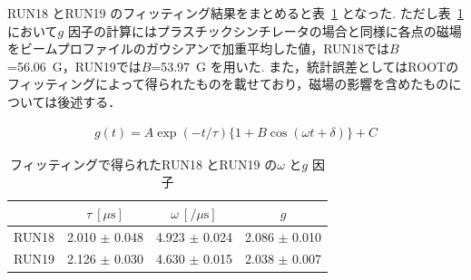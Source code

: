 RUN18 とRUN19 のフィッティング結果をまとめると表~\ref{tab:gfactor_result} となった.
ただし表~\ref{tab:gfactor_result} において$g$ 因子の計算にはプラスチックシンチレータの場合と同様に各点の磁場をビームプロファイルのガウシアンで加重平均した値，RUN18では$B$=56.06~G，RUN19では$B$=53.97~G を用いた.
また，統計誤差としてはROOTのフィッティングによって得られたものを載せており，磁場の影響を含めたものについては後述する．

\begin{gather}
g(t) = A\exp(-t / \tau)\{1+B\cos(\omega t+\delta)\}+C\label{eq:gfactor}
\end{gather}
\begin{table}[H]
\caption{フィッティングで得られたRUN18 とRUN19 の$\omega$ と$g$ 因子}
\centering
\begin{tabular}{cccc}\toprule
{} & $\tau~[\mu \mathrm{s}]$ & $\omega~[/\mu \mathrm{s}]$ & $g$ \\ \midrule
RUN18 & 2.010 $\pm$ 0.048 & 4.923 $\pm$ 0.024 & 2.086 $\pm$ 0.010  \\
RUN19 & 2.126 $\pm$ 0.030 & 4.630 $\pm$ 0.015 & 2.038 $\pm$ 0.007 \\ \bottomrule
\end{tabular}
\label{tab:gfactor_result}
\end{table}

